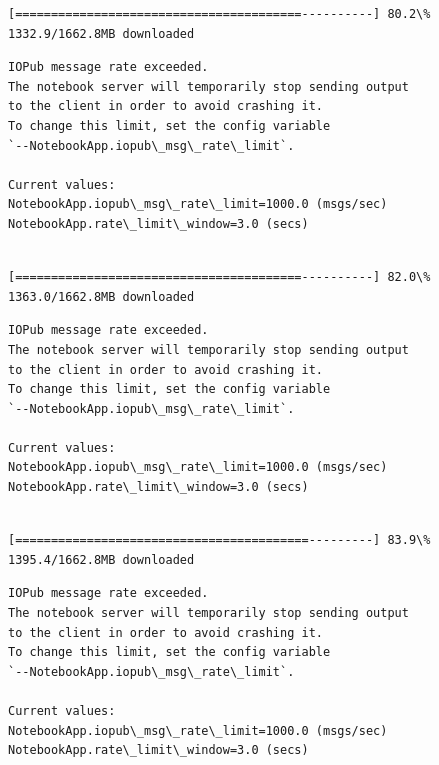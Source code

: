 \documentclass[11pt]{article}
\begin{document}
    \begin{Verbatim}[commandchars=\\\{\}]
[========================================----------] 80.2\% 1332.9/1662.8MB downloaded
    \end{Verbatim}

    \begin{Verbatim}[commandchars=\\\{\}]
IOPub message rate exceeded.
The notebook server will temporarily stop sending output
to the client in order to avoid crashing it.
To change this limit, set the config variable
`--NotebookApp.iopub\_msg\_rate\_limit`.

Current values:
NotebookApp.iopub\_msg\_rate\_limit=1000.0 (msgs/sec)
NotebookApp.rate\_limit\_window=3.0 (secs)


    \end{Verbatim}

    \begin{Verbatim}[commandchars=\\\{\}]
[========================================----------] 82.0\% 1363.0/1662.8MB downloaded
    \end{Verbatim}

    \begin{Verbatim}[commandchars=\\\{\}]
IOPub message rate exceeded.
The notebook server will temporarily stop sending output
to the client in order to avoid crashing it.
To change this limit, set the config variable
`--NotebookApp.iopub\_msg\_rate\_limit`.

Current values:
NotebookApp.iopub\_msg\_rate\_limit=1000.0 (msgs/sec)
NotebookApp.rate\_limit\_window=3.0 (secs)


    \end{Verbatim}

    \begin{Verbatim}[commandchars=\\\{\}]
[=========================================---------] 83.9\% 1395.4/1662.8MB downloaded
    \end{Verbatim}

    \begin{Verbatim}[commandchars=\\\{\}]
IOPub message rate exceeded.
The notebook server will temporarily stop sending output
to the client in order to avoid crashing it.
To change this limit, set the config variable
`--NotebookApp.iopub\_msg\_rate\_limit`.

Current values:
NotebookApp.iopub\_msg\_rate\_limit=1000.0 (msgs/sec)
NotebookApp.rate\_limit\_window=3.0 (secs)


    \end{Verbatim}
\end{document}
